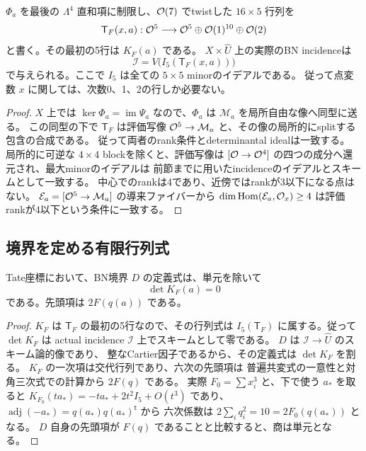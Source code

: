 \begin{proposition}[実際のincidenceの明示表示]\label{prop:tate-actual-incidence}
$\Phi_a$ を最後の $\Lambda^4$ 直和項に制限し、$\mathcal O(7)$ でtwistした
$16\times5$ 行列を
\[
 \mathsf T_F(x,a):\mathcal O^5\longrightarrow
 \mathcal O^5\oplus\mathcal O(1)^{10}\oplus\mathcal O(2)
\]
と書く。その最初の5行は $K_F(a)$ である。
$X\times\widehat U$ 上の実際のBN incidenceは
\[
              \mathcal I=V\bigl(I_5(\mathsf T_F(x,a))\bigr)
 \tag{T7a}\label{eq:tate-actual-incidence}
\]
で与えられる。ここで $I_5$ は全ての $5\times5$ minorのイデアルである。
従って点変数 $x$ に関しては、次数0、1、2の行しか必要ない。
\end{proposition}

\begin{proof}
$X$ 上では $\ker\Phi_a=\operatorname{im}\Psi_a$ なので、$\Phi_a$ は
$\mathcal M_a$ を局所自由な像へ同型に送る。
この同型の下で $\mathsf T_F$ は評価写像
$\mathcal O^5\to\mathcal M_a$ と、その像の局所的にsplitする包含の合成である。
従って両者のrank条件とdeterminantal idealは一致する。
局所的に可逆な $4\times4$ blockを除くと、評価写像は
$[\mathcal O\to\mathcal O^4]$ の四つの成分へ還元され、最大minorのイデアルは
前節までに用いたincidenceのイデアルとスキームとして一致する。
中心でのrankは4であり、近傍ではrankが3以下になる点はない。
$\mathcal E_a=[\mathcal O^5\to\mathcal M_a]$ の導来ファイバーから
$\dim\operatorname{Hom}(\mathcal E_a,\mathcal O_x)\ge4$ は評価rankが4以下という条件に一致する。
\end{proof}

\subsection{境界を定める有限行列式}

\begin{theorem}[境界の行列式表示]\label{thm:tate-boundary-determinant}
Tate座標において、BN境界 $D$ の定義式は、単元を除いて
\[
                         \det K_F(a)=0
 \tag{T8}\label{eq:tate-boundary-determinant}
\]
である。先頭項は $2F(q(a))$ である。
\end{theorem}

\begin{proof}
$K_F$ は $\mathsf T_F$ の最初の5行なので、その行列式は
$I_5(\mathsf T_F)$ に属する。従って $\det K_F$ は actual incidence
$\mathcal I$ 上でスキームとして零である。
$D$ は $\mathcal I\to\widehat U$ のスキーム論的像であり、
整なCartier因子であるから、その定義式は $\det K_F$ を割る。
$K_F$ の一次項は交代行列であり、六次の先頭項は
普遍共変式の一意性と対角三次式での計算から $2F(q)$ である。
実際 $F_0=\sum x_i^3$ と、下で使う $a_*$ を取ると
$K_{F_0}(ta_*)=-ta_*+2t^2I_5+O(t^3)$ であり、
$\operatorname{adj}(-a_*)=q(a_*)q(a_*)^{\mathsf t}$ から
六次係数は $2\sum_i q_i^2=10=2F_0(q(a_*))$ となる。
$D$ 自身の先頭項が $F(q)$ であることと比較すると、商は単元となる。
\end{proof}

